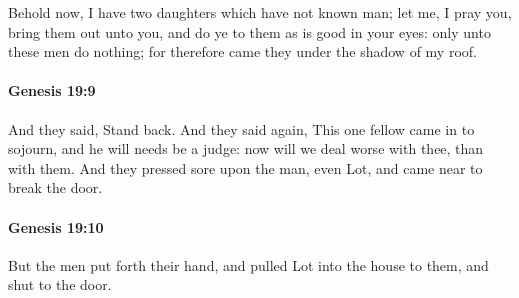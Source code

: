 			Behold now, I have two daughters which have not known man; let me, I pray you, bring them out unto you, and do ye to them as is good in your eyes: only unto these men do nothing; for therefore came they under the shadow of my roof.


		\paragraph{Genesis 19:9} %
			\label{GENESIS-19-9}

			And they said, Stand back.  And they said again, This one fellow came in to sojourn, and he will needs be a judge: now will we deal worse with thee, than with them.  And they pressed sore upon the man, even Lot, and came near to break the door.


		\paragraph{Genesis 19:10} %
			\label{GENESIS-19-10}

			But the men put forth their hand, and pulled Lot into the house to them, and shut to the door.


